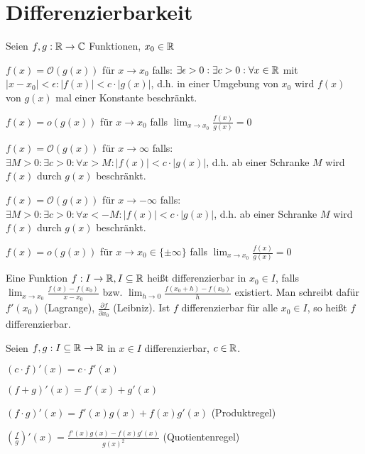 \pagebreak

\section{Differenzierbarkeit}

\begin{definition}
	Seien $f,g : \mathbb{R} \rightarrow \mathbb{C}$ Funktionen, $x_0 \in \mathbb{R}$
	\begin{description}[noitemsep]
		\item $f(x) = \mathcal{O}(g(x))$ für $x \rightarrow x_0$ falls: $\exists \epsilon > 0: \exists c > 0 : \forall x \in \mathbb{R}$ mit $|x - x _0| < \epsilon : |f(x)| < c \cdot |g(x)|$, d.h. in einer Umgebung von $x_0$ wird $f(x)$ von $g(x)$ mal einer Konstante beschränkt.
		\item $f(x) = o(g(x))$ für $x \rightarrow x_0$ falls $\lim_{x \rightarrow x_0} \frac{f(x)}{g(x)} = 0 $
		\item $f(x) = \mathcal{O}(g(x))$ für $x \rightarrow \infty$ falls: $\exists M > 0: \exists c > 0 : \forall x > M : |f(x)| < c \cdot |g(x)|$, d.h. ab einer Schranke $M$ wird $f(x)$ durch $g(x)$ beschränkt.
		\item $f(x) = \mathcal{O}(g(x))$ für $x \rightarrow -\infty$ falls: $\exists M > 0: \exists c > 0 : \forall x < -M : |f(x)| < c \cdot |g(x)|$, d.h. ab einer Schranke $M$ wird $f(x)$ durch $g(x)$ beschränkt.	
		\item $f(x) = o(g(x))$ für $x \rightarrow x_0 \in \{\pm \infty\}$ falls $\lim_{x \rightarrow x_0} \frac{f(x)}{g(x)} = 0 $
	\end{description}
\end{definition}

\begin{definition}[Differenzierbarkeit]
	Eine Funktion $f : I \rightarrow \mathbb{R}, I \subseteq \mathbb{R}$ heißt differenzierbar in $x_0 \in I$, falls $\lim_{x \rightarrow x_0} \frac{f(x) - f(x_0)}{x - x_0}$ bzw. $\lim_{h \rightarrow 0} \frac{f(x_0 + h) - f(x_0)}{h}$ existiert. Man schreibt dafür $f'(x_0)$ (Lagrange), $\frac{\partial f}{\partial x_0}$ (Leibniz). Ist $f$ differenzierbar für alle $x_0 \in I$, so heißt $f$ differenzierbar.
\end{definition}

\begin{satz}
	Seien $f,g : I \subseteq \mathbb{R} \rightarrow \mathbb{R}$ in $x \in I$ differenzierbar, $c \in \mathbb{R}$.
	\begin{description}[noitemsep]
		\item $(c \cdot f)'(x) = c \cdot f'(x) $
		\item $(f + g)'(x) = f'(x) + g'(x) $
		\item $(f \cdot g)'(x) = f'(x) g(x) + f(x)g'(x) $  (Produktregel)
		\item $(\frac{f}{g})'(x) = \frac{f'(x) g(x) - f(x)g'(x)}{g(x)^2} $	 (Quotientenregel)
	\end{description}
\end{satz}

